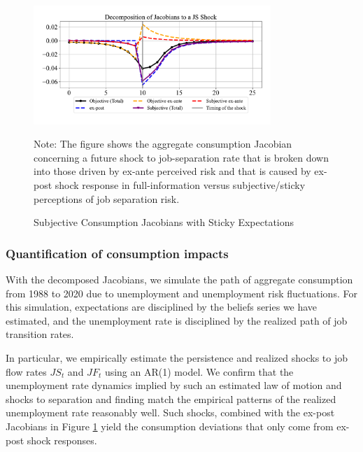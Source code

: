 \begin{figure}[pt]
    \centering
    \caption{Subjective Consumption Jacobians with Sticky Expectations}
    \label{fig:jac_decompose_sub}
\includegraphics[width=0.8\textwidth]{text/chapter2/Figures/JS_decomposition_subjective.pdf} 
\begin{flushleft}\footnotesize {Note: The figure shows the aggregate consumption Jacobian concerning a future shock to job-separation rate that is broken down into those driven by ex-ante perceived risk and that is caused by ex-post shock response in full-information versus subjective/sticky perceptions of job separation risk.} \end{flushleft}
\end{figure}


\subsubsection*{Quantification of consumption impacts}

With the decomposed Jacobians, we simulate the path of aggregate consumption from 1988 to 2020 due to unemployment and unemployment risk fluctuations. For this simulation, expectations are disciplined by the beliefs series we have estimated, and the unemployment rate is disciplined by the realized path of job transition rates. 

In particular, we empirically estimate the persistence and realized shocks to job flow rates $JS_{t}$ and $JF_{t}$ using an AR(1) model. We confirm that the unemployment rate dynamics implied by such an estimated law of motion and shocks to separation and finding match the empirical patterns of the realized unemployment rate reasonably well. Such shocks, combined with the ex-post Jacobians in Figure \ref{fig:jac_decompose_sub} yield the consumption deviations that only come from ex-post shock responses. 

